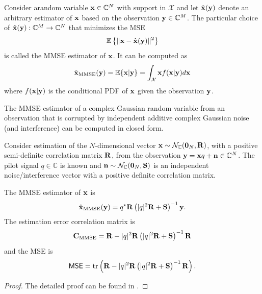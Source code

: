 \begin{definition} 
Consider a\linebreak random variable $\mathbf{x} \in \mathbb{C}^N$ with support in $\mathcal{X}$ and let $\hat{\mathbf{x}}(\mathbf{y})$ denote an arbitrary estimator of $\mathbf{x}$ based on the observation $\mathbf{y} \in \mathbb{C}^{M}$. The particular choice of  $\hat{\mathbf{x}}(\mathbf{y}) : \mathbb{C}^{M} \to \mathbb{C}^{N}$  that minimizes the \gls{MSE}
\begin{equation}
\mathbb{E} \left\{ \| \mathbf{x} - \hat{\mathbf{x}}(\mathbf{y}) \|^2 \right\}
\end{equation}
is called the \gls{MMSE} estimator of $\mathbf{x}$.
It can be computed as
\begin{equation}
\hat{\mathbf{x}}_{\mathrm{MMSE}}(\mathbf{y}) = \mathbb{E} \{ \mathbf{x} | \mathbf{y} \} = \int_{\mathcal{X}}  \mathbf{x} f(\mathbf{x} | \mathbf{y} ) d \mathbf{x}
\end{equation}
where $f(\mathbf{x} | \mathbf{y} ) $ is the conditional \gls{PDF} of $\mathbf{x}$ given the observation $\mathbf{y}$.
\end{definition}

The \gls{MMSE} estimator of a complex Gaussian random variable from an observation that is corrupted by independent additive complex Gaussian noise (and interference) can be computed in closed form.

\begin{lemma} \label{lemma:MMSE-estimator}
Consider estimation of the $N$-dimensional vector $\mathbf{x} \sim \mathcal{N}_{\mathbb{C}}(\mathbf{0}_N,\mathbf{R})$, with a positive semi-definite correlation matrix $\mathbf{R}$, from the observation $\mathbf{y} = \mathbf{x} q + \mathbf{n} \in \mathbb{C}^{N}$.
The pilot signal $q \in \mathbb{C}$ is known and $\mathbf{n} \sim \mathcal{N}_{\mathbb{C}}(\mathbf{0}_N,\mathbf{S})$ is an independent noise/interference vector with a positive definite correlation matrix. 

The \gls{MMSE} estimator of $\mathbf{x}$ is
\begin{equation} \label{eq_MMSE_channel_matrix-rankdef}
\begin{split}
\hat{\mathbf{x}}_{\mathrm{MMSE}}(\mathbf{y}) = q^\star  \mathbf{R}
\left( |q|^2 \mathbf{R} + \mathbf{S} \right)^{-1} \mathbf{y}.
\end{split}
\end{equation}
The estimation error correlation matrix is
\begin{equation} \label{eq_error_covariance_channel_matrix-rankdef}
 \mathbf{C}_{\mathrm{MMSE}} 
= \mathbf{R} -  |q|^2 \mathbf{R} 
 \left(  |q|^2 \mathbf{R} + \mathbf{S} \right)^{-1} \mathbf{R}
\end{equation}
and the \gls{MSE} is
\begin{equation} \label{eq_MSE_channel_matrix-rankdef}
\mathsf{MSE} = \mathrm{tr} \left( \mathbf{R} -  |q|^2 \mathbf{R} 
 \left(  |q|^2 \mathbf{R} + \mathbf{S} \right)^{-1} \mathbf{R} \right).
\end{equation}
\end{lemma}
\begin{proof}
The detailed proof can be found in \cite[App.~B.4]{massivemimobook}.
\end{proof}

